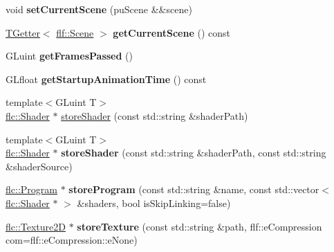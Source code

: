 \begin{DoxyCompactItemize}
\item 
void {\bfseries set\+Current\+Scene} (pu\+Scene \&\&scene)\hypertarget{classflw_1_1Engine_a15a611c51dec7cca5d9f53aa433c64ea}{}\label{classflw_1_1Engine_a15a611c51dec7cca5d9f53aa433c64ea}

\item 
\hyperlink{classflw_1_1TGetter}{T\+Getter}$<$ \hyperlink{classflw_1_1flf_1_1Scene}{flf\+::\+Scene} $>$ {\bfseries get\+Current\+Scene} () const \hypertarget{classflw_1_1Engine_a15f25cc34d9d952d8538389867e7de38}{}\label{classflw_1_1Engine_a15f25cc34d9d952d8538389867e7de38}

\item 
G\+Luint {\bfseries get\+Frames\+Passed} ()\hypertarget{classflw_1_1Engine_ad359cfb8982e2dd698a05b1c73eb534a}{}\label{classflw_1_1Engine_ad359cfb8982e2dd698a05b1c73eb534a}

\item 
G\+Lfloat {\bfseries get\+Startup\+Animation\+Time} () const \hypertarget{classflw_1_1Engine_af9df12dca5e42043fea9ae3f81d3b1cc}{}\label{classflw_1_1Engine_af9df12dca5e42043fea9ae3f81d3b1cc}

\item 
{\footnotesize template$<$G\+Luint T$>$ }\\\hyperlink{classflw_1_1flc_1_1Shader}{flc\+::\+Shader} $\ast$ \hyperlink{classflw_1_1Engine_a36555136687e9128629e0b2d9a0992d1}{store\+Shader} (const std\+::string \&shader\+Path)
\item 
{\footnotesize template$<$G\+Luint T$>$ }\\\hyperlink{classflw_1_1flc_1_1Shader}{flc\+::\+Shader} $\ast$ {\bfseries store\+Shader} (const std\+::string \&shader\+Path, const std\+::string \&shader\+Source)\hypertarget{classflw_1_1Engine_a752be0593e2f81094e3af50f0f36079f}{}\label{classflw_1_1Engine_a752be0593e2f81094e3af50f0f36079f}

\item 
\hyperlink{classflw_1_1flc_1_1Program}{flc\+::\+Program} $\ast$ {\bfseries store\+Program} (const std\+::string \&name, const std\+::vector$<$ \hyperlink{classflw_1_1flc_1_1Shader}{flc\+::\+Shader} $\ast$ $>$ \&shaders, bool is\+Skip\+Linking=false)\hypertarget{classflw_1_1Engine_a6ffbeb11f3c66a0412e807a4268b6b8e}{}\label{classflw_1_1Engine_a6ffbeb11f3c66a0412e807a4268b6b8e}

\item 
\hyperlink{classflw_1_1flc_1_1Texture2D}{flc\+::\+Texture2D} $\ast$ {\bfseries store\+Texture} (const std\+::string \&path, flf\+::e\+Compression com=flf\+::e\+Compression\+::e\+None)\hypertarget{classflw_1_1Engine_a9fb7df4341b1fd4555bc079738a031c6}{}\label{classflw_1_1Engine_a9fb7df4341b1fd4555bc079738a031c6}


\end{DoxyCompactItemize}
